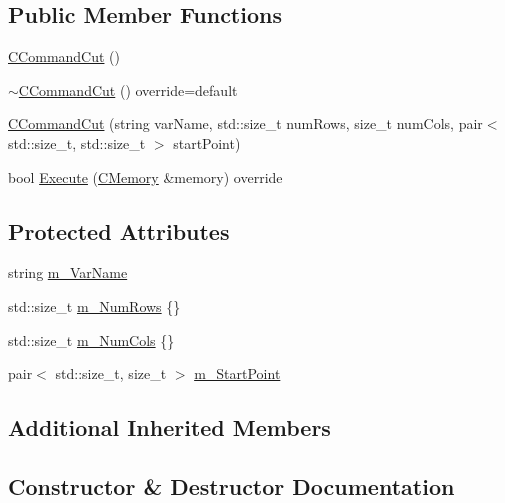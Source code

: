 \subsection*{Public Member Functions}
\begin{DoxyCompactItemize}
\item 
\hyperlink{classCCommandCut_aea6d6e3ee2b71412f0cd7d28ddf716a5}{C\+Command\+Cut} ()
\item 
\hyperlink{classCCommandCut_aa4c585b4f9fe99f10a39014329f02614}{$\sim$\+C\+Command\+Cut} () override=default
\item 
\hyperlink{classCCommandCut_adf50105fd0734790ab29a3bf1edfcd4e}{C\+Command\+Cut} (string var\+Name, std\+::size\+\_\+t num\+Rows, size\+\_\+t num\+Cols, pair$<$ std\+::size\+\_\+t, std\+::size\+\_\+t $>$ start\+Point)
\item 
bool \hyperlink{classCCommandCut_a18065504c797f4fde787a7dfd46bce74}{Execute} (\hyperlink{classCMemory}{C\+Memory} \&memory) override
\end{DoxyCompactItemize}
\subsection*{Protected Attributes}
\begin{DoxyCompactItemize}
\item 
string \hyperlink{classCCommandCut_aeb69b9b4f3e1c319de83c2753294e2db}{m\+\_\+\+Var\+Name}
\item 
std\+::size\+\_\+t \hyperlink{classCCommandCut_ae1021a795aa0ca34697021ed9c68ea33}{m\+\_\+\+Num\+Rows} \{\}
\item 
std\+::size\+\_\+t \hyperlink{classCCommandCut_a0073be24f9b9bfdb3a4194bd4ea16bbc}{m\+\_\+\+Num\+Cols} \{\}
\item 
pair$<$ std\+::size\+\_\+t, size\+\_\+t $>$ \hyperlink{classCCommandCut_adbd994d2b9e2620042427235516b446b}{m\+\_\+\+Start\+Point}
\end{DoxyCompactItemize}
\subsection*{Additional Inherited Members}


\subsection{Constructor \& Destructor Documentation}
